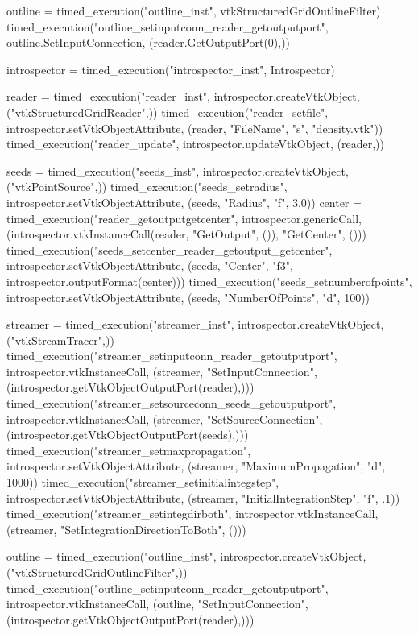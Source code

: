 \begin{appendices}
\begin{python}[label=lst:py-native-vtk,caption={Native Python VTK benchmark script},aboveskip=20pt]
outline = timed_execution("outline_inst", vtkStructuredGridOutlineFilter)
timed_execution("outline_setinputconn_reader_getoutputport", outline.SetInputConnection, (reader.GetOutputPort(0),))
\end{python}

\begin{python}[label=lst:py-intro-vtk,caption={Introspective Python VTK benchmark script},aboveskip=20pt]
introspector = timed_execution("introspector_inst", Introspector)

reader = timed_execution("reader_inst", introspector.createVtkObject, ("vtkStructuredGridReader",))
timed_execution("reader_setfile", introspector.setVtkObjectAttribute, (reader, "FileName", "s", "density.vtk"))
timed_execution("reader_update", introspector.updateVtkObject, (reader,))

seeds = timed_execution("seeds_inst", introspector.createVtkObject, ("vtkPointSource",))
timed_execution("seeds_setradius", introspector.setVtkObjectAttribute, (seeds, "Radius", "f", 3.0))
center = timed_execution("reader_getoutputgetcenter", introspector.genericCall, (introspector.vtkInstanceCall(reader, "GetOutput", ()), "GetCenter", ()))
timed_execution("seeds_setcenter_reader_getoutput_getcenter", introspector.setVtkObjectAttribute, (seeds, "Center", "f3", introspector.outputFormat(center)))
timed_execution("seeds_setnumberofpoints", introspector.setVtkObjectAttribute, (seeds, "NumberOfPoints", "d", 100))

streamer = timed_execution("streamer_inst", introspector.createVtkObject, ("vtkStreamTracer",))
timed_execution("streamer_setinputconn_reader_getoutputport", introspector.vtkInstanceCall, (streamer, "SetInputConnection", (introspector.getVtkObjectOutputPort(reader),)))
timed_execution("streamer_setsourceconn_seeds_getoutputport", introspector.vtkInstanceCall, (streamer, "SetSourceConnection", (introspector.getVtkObjectOutputPort(seeds),)))
timed_execution("streamer_setmaxpropagation", introspector.setVtkObjectAttribute, (streamer, "MaximumPropagation", "d", 1000))
timed_execution("streamer_setinitialintegstep", introspector.setVtkObjectAttribute, (streamer, "InitialIntegrationStep", "f", .1))
timed_execution("streamer_setintegdirboth", introspector.vtkInstanceCall, (streamer, "SetIntegrationDirectionToBoth", ()))

outline = timed_execution("outline_inst", introspector.createVtkObject, ("vtkStructuredGridOutlineFilter",))
timed_execution("outline_setinputconn_reader_getoutputport", introspector.vtkInstanceCall, (outline, "SetInputConnection", (introspector.getVtkObjectOutputPort(reader),)))
\end{python}


\end{appendices}
